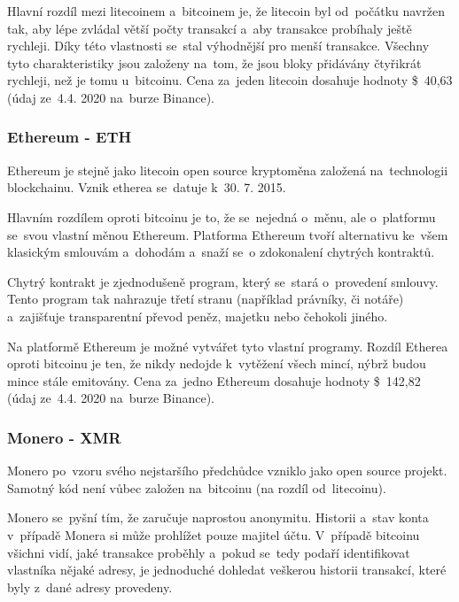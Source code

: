 \documentclass[thesis=B,czech]{FITthesis}[2019/03/21]
\begin{document}
Hlavní rozdíl mezi litecoinem a~bitcoinem je, že litecoin byl od~počátku navržen tak, aby lépe zvládal větší počty transakcí a~aby transakce probíhaly ještě rychleji. Díky této vlastnosti se~stal výhodnější pro menší transakce. Všechny tyto charakteristiky jsou založeny na~tom, že jsou bloky přidávány čtyřikrát rychleji, než je tomu u~bitcoinu. \cite{litecoin} Cena za~jeden litecoin dosahuje hodnoty \$~40,63 (údaj ze~4.4. 2020 na~burze Binance). \cite{binance_markets}

\subsubsection{Ethereum - ETH}
Ethereum je stejně jako litecoin open source kryptoměna založená na~technologii blockchainu. Vznik etherea se~datuje k~30. 7. 2015. 

Hlavním rozdílem oproti bitcoinu je to, že se~nejedná o~měnu, ale o~platformu se~svou vlastní měnou Ethereum. Platforma Ethereum tvoří alternativu ke~všem klasickým smlouvám a~dohodám a~snaží se~o zdokonalení chytrých kontraktů. \cite{btc_vs_eth}

Chytrý kontrakt je zjednodušeně program, který se~stará o~provedení smlouvy. Tento program tak nahrazuje třetí stranu (například právníky, či notáře) a~zajišťuje transparentní převod peněz, majetku nebo čehokoli \linebreak jiného. \cite{ethereum}

Na platformě Ethereum je možné vytvářet tyto vlastní programy. \cite{ethereum} Rozdíl Etherea oproti bitcoinu je ten, že nikdy nedojde k~vytěžení všech mincí, nýbrž budou mince stále emitovány. \cite{alza_monero} Cena za~jedno Ethereum dosahuje hodnoty  \$~142,82 (údaj ze~4.4. 2020 na~burze Binance). \cite{binance_markets}

\subsubsection{Monero - XMR}
Monero po~vzoru svého nejstaršího předchůdce vzniklo jako open source projekt. Samotný kód není vůbec založen na~bitcoinu (na rozdíl od~litecoinu). 

Monero se~pyšní tím, že zaručuje naprostou anonymitu. Historii a~stav konta v~případě Monera si může prohlížet pouze majitel účtu. V~případě bitcoinu všichni vidí, jaké transakce proběhly a~pokud se~tedy podaří identifikovat vlastníka nějaké adresy, je jednoduché dohledat veškerou historii transakcí, které byly z~dané adresy provedeny.
\end{document}
